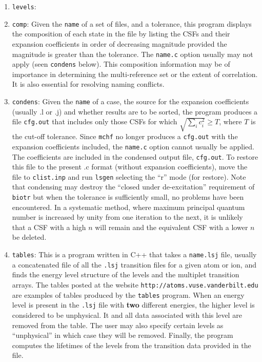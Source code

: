 \documentclass[fleqn,10pt]{book}
\begin{document}
\begin{enumerate}

\item {\tt levels}: 
\item {\tt comp}:  Given the {\tt name} of a set of files, and a tolerance, this program displays the 
composition of each state in the file by listing the  CSFs and their expansion coefficients in order of
 decreasing magnitude provided the magnitude is greater than the tolerance.
 The {\tt name.c} option usually may not apply (seen {\tt condens} below).
 This composition information may be of importance in determining the multi-reference 
set or the extent of correlation.  It is also essential for resolving naming conflicts.

\item {\tt condens}: Given the {\tt name} of a case,
the source for the expansion coefficients (usually .l or .j) and whether results are to be sorted,
 the program produces a file {\tt cfg.out} that includes only those CSFs for which  $\sqrt{\sum_i c_i^2}
 \ge T$, where $T$ is the cut-off tolerance. 
 Since {\tt mchf} no longer produces a {\tt cfg.out} with the
expansion coefficients included, the {\tt name.c} option cannot usually be applied.
  The coefficients are included in 
the condensed output file, {\tt cfg.out}. 
  To restore this file to the present .c format (without expansion coefficients), 
  move the file to {\tt clist.inp} and run {\tt lsgen} 
selecting the ``r'' mode (for restore).  Note that condensing may destroy the ``closed under 
de-excitation'' requirement of  {\tt biotr} but when the tolerance is sufficiently small, no problems have been encountered. 
In a systematic method, where
maximum principal quantum number is increased by unity from one iteration to 
the next, it is unlikely that a CSF with a high $n$ will remain and the
equivalent CSF with a lower $n$ be deleted.






\item {\tt tables}:  This is a program written in C++ that takes a {\tt name.lsj} file, usually a concatenated file of all the {\tt .lsj} transition files 
for a given atom or ion,
and finds the energy level structure of the levels and the multiplet
transition arrays. The tables posted at 
the website {\tt http://atoms.vuse.vanderbilt.edu} are examples of tables
produced by the {\tt tables} program.
When an energy level is present in the {\tt .lsj} file with {\bf two} different 
energies, the higher level is considered to be unphysical.  It and all data 
associated with this level are removed from the table.  The user may also 
specify certain levels as ``unphysical'' in which case they will be removed. 
 Finally, the program computes the lifetimes of
 the levels from the transition data provided in the file.


\end{enumerate}
\end{document}
